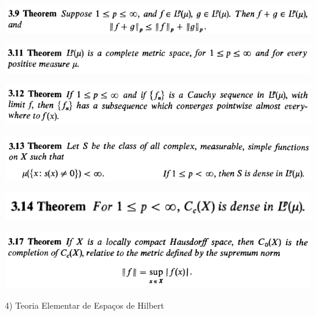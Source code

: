 \documentclass[12pt]{article}
\begin{document}
		\begin{center}
		\includegraphics{3ponto9}
		\end{center}

		\begin{center}
		\includegraphics{3ponto11}
		\end{center}

		\begin{center}
		\includegraphics{3ponto12}
		\end{center}

		\begin{center}
		\includegraphics{3ponto13}
		\end{center}

		\begin{center}
		\includegraphics{3ponto14}
		\end{center}

		\begin{center}
		\includegraphics{3ponto17}
		\end{center}

\vspace{3mm}

4) Teoria Elementar de Espa\c{c}os de Hilbert

\vspace{3mm}
\end{document}
